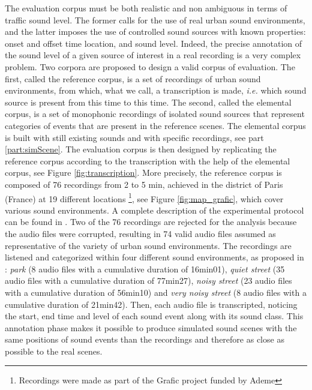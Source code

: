 \documentclass[review,5p,twocolumn,sort&compress,times]{elsarticle}
\begin{document}
The evaluation corpus must be both realistic and non ambiguous in terms of traffic sound level. The former calls for the use of real urban sound environments, and the latter imposes the use of controlled sound sources with known properties: onset and offset time location, and sound level. Indeed, the precise annotation of the sound level of a given source of interest in a real recording is a very complex problem. Two corpora are proposed to design a valid corpus of  evaluation. The first, called the reference corpus, is a set of recordings of urban sound environments, from which, what we call, a transcription is made, \textit{i.e.} which sound source is present from this time to this time. The second, called the elemental corpus, is a set of monophonic recordings of isolated sound sources that represent categories of events that are present in the reference scenes. The elemental corpus is built with still existing sounds and with specific recordings, see part \ref{part:simScene}. The evaluation corpus is then designed by replicating the reference corpus according to the transcription with the help of the elemental corpus, see Figure \ref{fig:transcription}.
More precisely, the reference corpus is composed of 76 recordings from 2 to 5 min, achieved in the  district of Paris (France) at 19 different locations \footnote{Recordings were made as part of the Grafic project funded by Ademe}, see Figure \ref{fig:map_grafic}, which cover various sound environments. A complete description of the experimental protocol can be found in \cite{aumond_modelling_2017}. Two of the 76 recordings are rejected for the analysis because the audio files were corrupted, resulting in 74 valid audio files assumed as representative of the variety of urban sound environments. The recordings are listened and categorized within four different sound environments, as proposed in \cite{can_describing_2015}: \textit{park} (8 audio files with a cumulative duration of 16min01), \textit{quiet street} (35 audio files with a cumulative duration of 77min27), \textit{noisy street} (23 audio files with a cumulative duration of 56min10) and \textit{very noisy street} (8 audio files with a cumulative duration of 21min42). Then, each audio file is transcripted, noticing the start, end time and level of each sound event along with its sound class. This annotation phase makes it possible to produce simulated sound scenes with the same positions of sound events than the recordings and therefore as close as possible to the real scenes.
\end{document}
